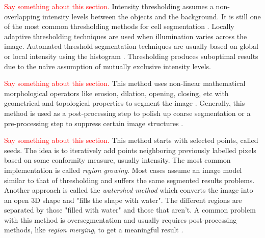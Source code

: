 \begin{definition}
	\textcolor{red}{Say something about this section.}
	Intensity thresholding assumes a non-overlapping intensity levels between the objects and the background.
	It is still one of the most common thresholding methods for cell segmentation \citep{WuMerchantCastleman2008,Meijering2004,Quanli2011}.
	Locally adaptive thresholding techniques are used when illumination varies across the image.
	Automated threshold segmentation techniques are usually based on global or local intensity using the histogram \citep{Bengtsson2004}.
	Thresholding produces suboptimal results due to the na{\"i}ve assumption of mutually exclusive intensity levels.
\end{definition}

\begin{definition}
	\textcolor{red}{Say something about this section.}
	This method uses non-linear mathematical morphological operators like erosion, dilation, opening, closing, etc with geometrical and topological properties to segment the image \citep{GonzalezWoods2002,Meijering2004,Dorini2007,Anoraganingrum1999,Kumar2002}.
	Generally, this method is used as a post-processing step to polish up coarse segmentation or a pre-processing step to suppress certain image structures \citep{Bengtsson2004}.
\end{definition}

\begin{definition}
	\textcolor{red}{Say something about this section.}
	This method starts with selected points, called seeds.
	The idea is to iteratively add points neighboring previously labelled pixels based on some conformity measure, usually intensity.
	The most common implementation is called \textit{region growing}.
	Most cases assume an image model similar to that of thresholding and suffers the same segmented results problems.
	Another approach is called the \textit{watershed method} which converts the image into an open 3D shape and "fills the shape with water".
	The different regions are separated by those "filled with water" and those that aren't.
	A common problem with this method is oversegmentation and usually requires post-processing methods, like \textit{region merging}, to get a meaningful result \citep{Jiang2003,Lin2003,Bengtsson2004}.
\end{definition}


